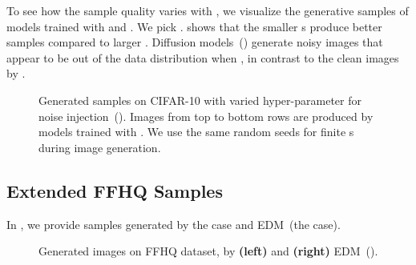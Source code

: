 To see how the sample quality varies with , we visualize the generative samples of models trained with  and . We pick .  shows that the smaller s produce better samples compared to larger . Diffusion models~() generate noisy images that appear to be out of the data distribution when , in contrast to the clean images by .
\begin{figure*}
    \centering
{}\hfill
{}\hfill
{}

\hfill
{}\hfill
{}

\hfill
{}\hfill
{}

\hfill
{}\hfill
{}
    \caption{Generated samples on CIFAR-10 with varied hyper-parameter for noise injection~(). Images from top to bottom rows are produced by models trained with . We use the same random seeds for finite s during image generation.}
    \label{fig:robust_vis}
\end{figure*}

\subsection{Extended FFHQ Samples}

In , we provide samples generated by the  case and EDM~(the  case).
\begin{figure*}
\centering
    \hfill
    \caption{Generated images on FFHQ  dataset, by \textbf{(left)}  and \textbf{(right)} EDM~().}
    \label{fig:ffhq-vis}
\end{figure*}


